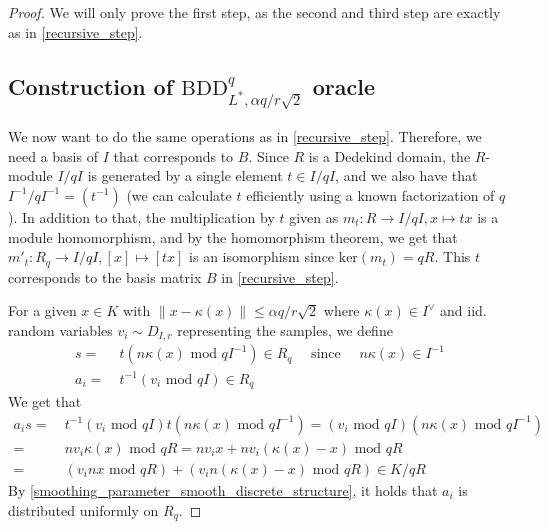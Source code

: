 \documentclass{report}
\renewcommand{\mod}{\text{ mod }}
\begin{document}
\begin{proof}
We will only prove the first step, as the second and third step are exactly as in \ref{recursive_step}.

\subsection{Construction of $\mathrm{BDD}_{L^*, \alpha q / r\sqrt{2}}^q$ oracle} 

We now want to do the same operations as in \ref{recursive_step}. Therefore, we need a basis of $I$ that corresponds to $B$. Since $R$ is a Dedekind domain, the $R$-module $I / qI$ is generated by a single element $t \in I / qI$, and we also have that $I^{-1} / qI^{-1} = (t^{-1})$ (we can calculate $t$ efficiently using a known factorization of $q$). In addition to that, the multiplication by $t$ given as $m_t: R \to I / qI, x \mapsto tx$ is a module homomorphism, and by the homomorphism theorem, we get that $m'_t: R_q \to I / qI, [x] \mapsto [tx]$ is an isomorphism since $\mathrm{ker}(m_t) = qR$. This $t$ corresponds to the basis matrix $B$ in \ref{recursive_step}.

For a given $x \in K$ with $\| x - \kappa(x) \| \leq \alpha q / r\sqrt{2}$ where $\kappa(x) \in I^\vee$ and iid. random variables $v_i \sim D_{I, r}$ representing the samples, we define
\begin{equation}
\begin{split}
s =\ & t (n\kappa(x) \mod qI^{-1}) \in R_q \quad \text{ since }\quad n\kappa(x) \in I^{-1} \\
a_i =\ & t^{-1} (v_i \mod qI) \in R_q \nonumber
\end{split}
\end{equation}
We get that
\begin{equation}
\begin{split}
a_i s =\ & t^{-1} (v_i \mod qI) t (n\kappa(x) \mod qI^{-1}) = (v_i \mod qI) (n\kappa(x) \mod qI^{-1}) \\
=\ & n v_i \kappa(x) \mod qR = n v_i x + n v_i (\kappa(x) - x) \mod qR \\
=\ & (v_i n x \mod qR) + (v_i n (\kappa(x) - x) \mod qR) \in K / qR
\end{split} \nonumber
\end{equation}
By \ref{smoothing_parameter_smooth_discrete_structure}, it holds that $a_i$ is distributed uniformly on $R_q$.


\end{proof}
\end{document}
